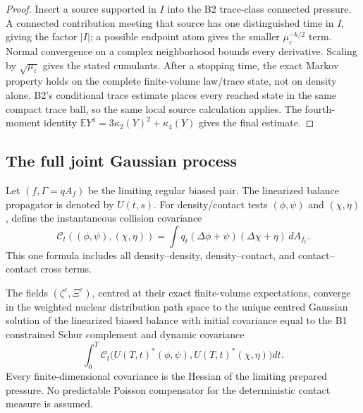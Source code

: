 \begin{proof}
Insert a source supported in \(I\) into the B2 trace-class connected pressure.
A connected contribution meeting that source has one distinguished time in
\(I\), giving the factor \(|I|\); a possible endpoint atom gives the smaller
\(\mu_\varepsilon^{-k/2}\) term.  Normal convergence on a complex
neighborhood bounds every derivative.  Scaling by
\(\sqrt{\mu_\varepsilon}\) gives the stated cumulants.  After a stopping time,
the exact Markov property holds on the complete finite-volume law/trace state,
not on density alone.  B2's conditional trace estimate places every reached
state in the same compact trace ball, so the same local source calculation
applies.  The fourth-moment identity
\(\mathbb EY^4=3\kappa_2(Y)^2+\kappa_4(Y)\) gives the final estimate.
\end{proof}

\subsection{The full joint Gaussian process}

Let \((f,\Gamma=qA_f)\) be the limiting regular biased pair.  The linearized
balance propagator is denoted by \(U(t,s)\).  For density/contact tests
\((\phi,\psi)\) and \((\chi,\eta)\), define the instantaneous collision
covariance
\[
\mathcal C_t((\phi,\psi),(\chi,\eta))
=
\int q_t
(\Delta\phi+\psi)(\Delta\chi+\eta)\,dA_{f_t}.
\]
This one formula includes all density--density, density--contact, and
contact--contact cross terms.

\begin{theorem}
\label{thm:r6-b3-gaussian}
The fields \((\zeta^\varepsilon,\Xi^\varepsilon)\), centred at their exact
finite-volume expectations, converge in the weighted nuclear distribution
path space to the unique centred Gaussian solution of the linearized biased
balance with initial covariance equal to the B1 constrained Schur complement
and dynamic covariance
\[
\int_0^T
\mathcal C_t\bigl(U(T,t)^*(\phi,\psi),
U(T,t)^*(\chi,\eta)\bigr)dt.
\]
Every finite-dimensional covariance is the Hessian of the limiting prepared
pressure.  No predictable Poisson compensator for the deterministic contact
measure is assumed.
\end{theorem}

